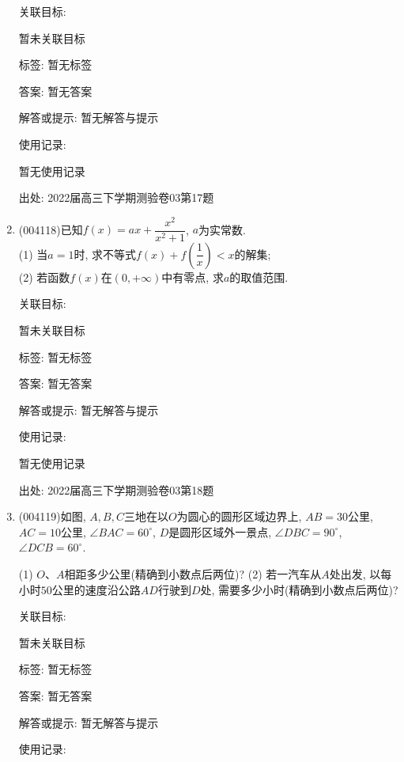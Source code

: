 \documentclass[10pt,a4paper]{article}
\begin{document}
\begin{enumerate}[1.]
关联目标:

暂未关联目标



标签: 暂无标签

答案: 暂无答案

解答或提示: 暂无解答与提示

使用记录:

暂无使用记录


出处: 2022届高三下学期测验卷03第17题
\item { (004118)}已知$f(x)=ax+\dfrac{x^2}{x^2+1}$, $a$为实常数.\\
(1) 当$a=1$时, 求不等式$f(x)+f(\dfrac 1x)<x$的解集;\\
(2) 若函数$f(x)$在$(0,+\infty)$中有零点, 求$a$的取值范围.


关联目标:

暂未关联目标



标签: 暂无标签

答案: 暂无答案

解答或提示: 暂无解答与提示

使用记录:

暂无使用记录


出处: 2022届高三下学期测验卷03第18题
\item { (004119)}如图, $A,B,C$三地在以$O$为圆心的圆形区域边界上, $AB=30$公里, $AC=10$公里, $\angle BAC=60^\circ$, $D$是圆形区域外一景点, $\angle DBC=90^\circ$, $\angle DCB=60^\circ$.
\begin{center}
\end{center}
(1) $O$、$A$相距多少公里(精确到小数点后两位)?
(2) 若一汽车从$A$处出发, 以每小时$50$公里的速度沿公路$AD$行驶到$D$处, 需要多少小时(精确到小数点后两位)?


关联目标:

暂未关联目标



标签: 暂无标签

答案: 暂无答案

解答或提示: 暂无解答与提示

使用记录:


\end{enumerate}
\end{document}
